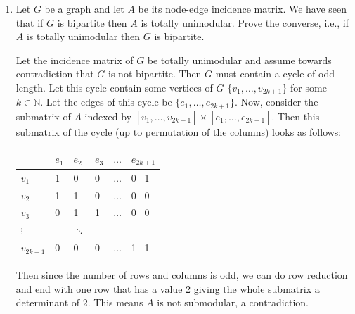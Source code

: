 \documentclass[11pt]{article}
\begin{document}
\begin{enumerate}[1)]
\item Let $G$ be a graph and let $A$ be its node-edge incidence matrix. We have seen that if $G$ is
bipartite then $A$ is totally unimodular. Prove the converse, i.e., if $A$ is totally unimodular then $G$
is bipartite.

\begin{solution}
Let the incidence matrix of $G$ be totally unimodular and assume towards contradiction that $G$ is not bipartite. Then $G$ must contain a cycle of odd length. Let this cycle contain some vertices of $G$ $\{v_1, \hdots, v_{2k+1}\}$ for some $k \in \mathbb{N}$. Let the edges of this cycle be $\{e_1, \hdots, e_{2k+1}\}$. Now, consider the submatrix of $A$ indexed by $[v_1, \hdots, v_{2k+1}] \times [e_1, \hdots, e_{2k+1}]$.  
Then this submatrix of the cycle (up to permutation of the columns) looks as follows: \\

\begin{tabular}{l | l l l l l }
 & $e_1$ & $e_2$ &$e_3$ & $\hdots$ & $e_{2k+1}$ \\
 \midrule
$v_1$ & 1 & 0 & 0 &  $\hdots$ & 0 \ 1 \\
$v_2$ & 1 & 1 & 0 & $\hdots$ & 0 \ 0 \\
$v_3$ & 0 & 1 & 1 & $\hdots$ &  0 \ 0  \\
$\vdots$ & & $\ddots$ & & &  \\
$v_{2k+1}$ & 0 & 0 & 0 & $\hdots$ & 1 \ 1
\end{tabular}

Then since the number of rows and columns is odd, we can do row reduction and end with one row that has a value 2 giving the whole submatrix a determinant of 2. This means $A$ is not submodular, a contradiction. 
\end{solution}




\end{enumerate}
\end{document}
